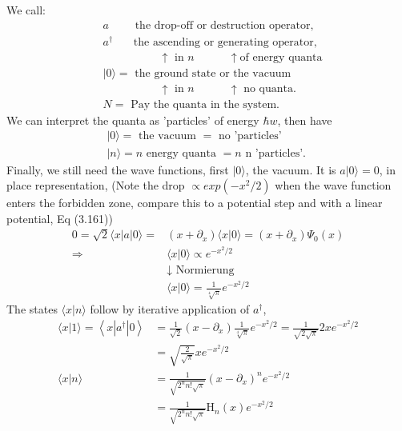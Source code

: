 We call:
\begin{equation}
\begin{aligned} 
    &a  \qquad \text { the drop-off or destruction operator, } \\ 
    &a^{\dagger} \,\,\,\quad\text { the ascending or generating operator, } \\ 
    & \qquad\qquad\quad \uparrow \text { in } n \qquad\quad\uparrow\text{of energy quanta}\\
    &|0\rangle= \text { the ground state or the vacuum } \\ 
    & \qquad\qquad\quad  \uparrow \text { in } n\qquad\quad\uparrow \text{ no quanta.} \\ 
    &N= \text { Pay the quanta in the system. } \end{aligned}
\end{equation}
We can interpret the quanta as 'particles' of energy $\hbar w$, then have
\begin{equation}
\begin{array}{l}{|0\rangle=\text { the vacuum }=\text { no 'particles' }} \\ {|n\rangle= n \text { energy quanta }=n \text { n 'particles'. }}\end{array}
\end{equation}
Finally, we still need the wave functions, first $| 0\rangle$, the vacuum. It is $a | 0\rangle = 0$, in place representation, (Note the drop $\propto exp (-x^2 / 2)$ when the wave function enters the forbidden zone, compare this to a potential step and with a linear potential, Eq (3.161))
\begin{equation}
\begin{aligned} 0=\sqrt{2}\langle x|a| 0\rangle=&\left(x+\partial_{x}\right)\langle x | 0\rangle=\left(x+\partial_{x}\right) \Psi_{0}(x) \\ \Rightarrow &\langle x | 0\rangle \propto e^{-x^{2} / 2} \\ & \downarrow \text { Normierung } \\ &\langle x | 0\rangle=\frac{1}{\sqrt[4]{\pi}} e^{-x^{2} / 2} \end{aligned}
\end{equation}
The states $\langle x | n\rangle$ follow by iterative application of $a^{\dagger}$,
\begin{equation}
\begin{aligned}\langle x | 1\rangle=\left\langle x\left|a^{\dagger}\right| 0\right\rangle &=\frac{1}{\sqrt{2}}\left(x-\partial_{x}\right) \frac{1}{\sqrt[4]{\pi}} e^{-x^{2} / 2}=\frac{1}{\sqrt{2 \sqrt{\pi}}} 2 x e^{-x^{2} / 2} \\ &=\sqrt{\frac{2}{\sqrt{\pi}}} x e^{-x^{2} / 2} \\\langle x | n\rangle &=\frac{1}{\sqrt{2^{n} n ! \sqrt{\pi}}}\left(x-\partial_{x}\right)^{n} e^{-x^{2} / 2} \\ &=\frac{1}{\sqrt{2^{n} n ! \sqrt{\pi}}} \mathrm{H}_{n}(x) e^{-x^{2} / 2} \end{aligned}
\end{equation}
